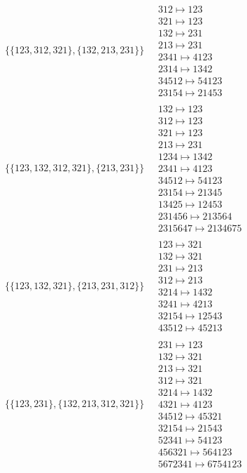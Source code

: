 \begin{scriptsize}
\begin{align}
\begin{matrix}
\end{matrix}
\\
\{\{123, 312, 321\}, \{132, 213, 231\}\}
\ 
&
\begin{matrix}
312 \mapsto 123\\321 \mapsto 123\\132 \mapsto 231\\213 \mapsto 231\\2341 \mapsto 4123\\2314 \mapsto 1342\\34512 \mapsto 54123\\23154 \mapsto 21453
\end{matrix}
\\
\{\{123, 132, 312, 321\}, \{213, 231\}\}
\ 
&
\begin{matrix}
132 \mapsto 123\\312 \mapsto 123\\321 \mapsto 123\\213 \mapsto 231\\1234 \mapsto 1342\\2341 \mapsto 4123\\34512 \mapsto 54123\\23154 \mapsto 21345\\13425 \mapsto 12453\\231456 \mapsto 213564\\2315647 \mapsto 2134675
\end{matrix}
\\
\{\{123, 132, 321\}, \{213, 231, 312\}\}
\ 
&
\begin{matrix}
123 \mapsto 321\\132 \mapsto 321\\231 \mapsto 213\\312 \mapsto 213\\3214 \mapsto 1432\\3241 \mapsto 4213\\32154 \mapsto 12543\\43512 \mapsto 45213
\end{matrix}
\\
\{\{123, 231\}, \{132, 213, 312, 321\}\}
\ 
&
\begin{matrix}
231 \mapsto 123\\132 \mapsto 321\\213 \mapsto 321\\312 \mapsto 321\\3214 \mapsto 1432\\4321 \mapsto 4123\\34512 \mapsto 45321\\32154 \mapsto 21543\\52341 \mapsto 54123\\456321 \mapsto 564123\\5672341 \mapsto 6754123

\end{matrix}
\end{align}
\end{scriptsize}
